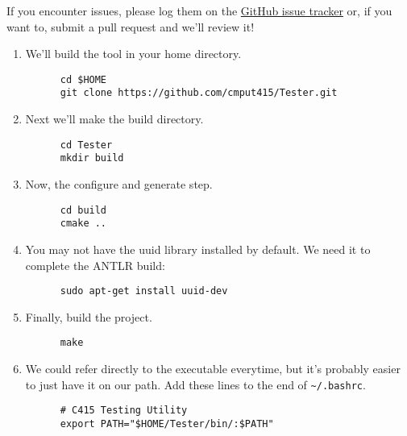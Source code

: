 \documentclass[../setup.tex]{subfiles}
\begin{document}
If you encounter issues, please log them on the \href{https://github.com/cmput415/Tester/issues}
{GitHub issue tracker} or, if you want to, submit a pull request and we'll review it!
\begin{enumerate}
  \item
    We'll build the tool in your home directory.
    \begin{lstlisting}
      cd $HOME
      git clone https://github.com/cmput415/Tester.git
    \end{lstlisting}
  \item
    Next we'll make the build directory.
    \begin{lstlisting}
      cd Tester
      mkdir build
    \end{lstlisting}
  \item
    Now, the configure and generate step.
    \begin{lstlisting}
      cd build
      cmake ..
    \end{lstlisting}
  \item
    You may not have the uuid library installed by default. We need it to complete the ANTLR build:
    \begin{lstlisting}
      sudo apt-get install uuid-dev
    \end{lstlisting}
  \item
    Finally, build the project.
    \begin{lstlisting}
      make
    \end{lstlisting}
  \item
    We could refer directly to the executable everytime, but it's probably easier to just have it
    on our path. Add these lines to the end of \lstinline{~/.bashrc}.
    \begin{lstlisting}
      # C415 Testing Utility
      export PATH="$HOME/Tester/bin/:$PATH"
    \end{lstlisting}
\end{enumerate}
\end{document}
